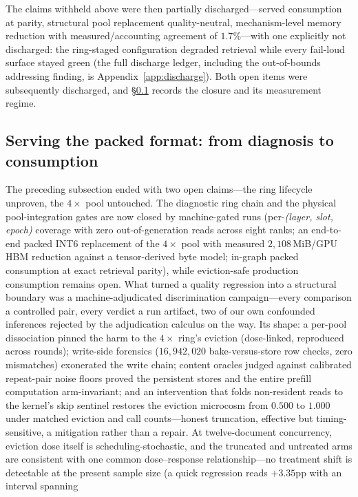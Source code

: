 \documentclass[11pt]{article}
\begin{document}
The claims withheld above were then partially discharged---served
consumption at parity, structural pool replacement quality-neutral,
mechanism-level memory reduction with measured/accounting agreement of
$1.7\%$---with one explicitly not discharged: the ring-staged configuration
degraded retrieval while every fail-loud surface stayed green (the full
discharge ledger, including the out-of-bounds addressing finding, is
Appendix~\ref{app:discharge}).
Both open items were subsequently discharged, and
\S\ref{sec:served} records the closure and its measurement regime.

\subsection{Serving the packed format: from diagnosis to consumption}
\label{sec:served}

The preceding subsection ended with two open claims---the ring lifecycle
unproven, the $4\times$ pool untouched. The diagnostic ring chain and the
physical pool-integration gates are now closed by machine-gated runs
(per-\emph{(layer, slot, epoch)} coverage with zero out-of-generation
reads across eight ranks; an end-to-end packed INT6 replacement of the
$4\times$ pool with measured $2{,}108$\,MiB/GPU HBM reduction against a
tensor-derived byte model; in-graph packed consumption at exact retrieval
parity), while eviction-safe production consumption remains open. What
turned a quality regression into a structural boundary was a
machine-adjudicated discrimination campaign---every comparison a
controlled pair, every verdict a run artifact, two of our own confounded
inferences rejected by the adjudication calculus on the way. Its shape:
a per-pool dissociation pinned the harm to the $4\times$ ring's
eviction (dose-linked, reproduced across rounds); write-side forensics
($16{,}942{,}020$ bake-versus-store row checks, zero mismatches)
exonerated the write chain; content oracles judged against calibrated
repeat-pair noise floors proved the persistent stores and the entire
prefill computation arm-invariant; and an intervention that folds
non-resident reads to the kernel's skip sentinel restores the eviction
microcosm from $0.500$ to $1.000$ under matched eviction and call
counts---honest truncation, effective but timing-sensitive, a
mitigation rather than a repair. At twelve-document concurrency,
eviction dose itself is scheduling-stochastic, and the truncated
and untreated arms are consistent with one common dose--response
relationship---no treatment shift is detectable at the present sample
size (a quick regression reads $+3.35$pp with an interval spanning
\end{document}
